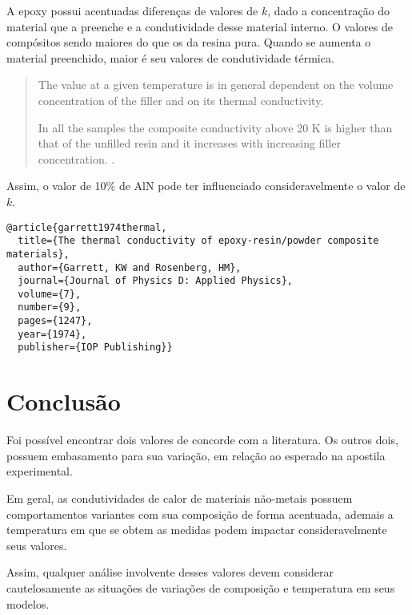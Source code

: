 \documentclass[11pt]{article}
\begin{document}
A epoxy possui acentuadas diferenças de valores de \(k\), dado a concentração do material que a preenche e a condutividade desse material interno. O valores de compósitos sendo maiores do que os da resina pura. Quando se aumenta o material preenchido, maior é seu valores de condutividade térmica.

\begin{quote}
The value at a given temperature is in general dependent on the volume concentration of the filler and on its thermal conductivity. 

In all the samples the composite conductivity above 20 K is higher than that of the unfilled resin and it increases with increasing filler concentration. \cite{garrett1974thermal}.
\end{quote}

Assim, o valor de 10\% de AlN pode ter influenciado consideravelmente o valor de \(k\).

\begin{verbatim}
@article{garrett1974thermal,
  title={The thermal conductivity of epoxy-resin/powder composite materials},
  author={Garrett, KW and Rosenberg, HM},
  journal={Journal of Physics D: Applied Physics},
  volume={7},
  number={9},
  pages={1247},
  year={1974},
  publisher={IOP Publishing}}
\end{verbatim}

\section{Conclusão}
\label{sec:org77b9d04}

Foi possível encontrar dois valores de concorde com a literatura. Os outros dois, possuem embasamento para sua variação, em relação ao esperado na apostila experimental.

Em geral, as condutividades de calor de materiais não-metais possuem comportamentos variantes com sua composição de forma acentuada, ademais a temperatura em que se obtem as medidas podem impactar consideravelmente seus valores.

Assim, qualquer análise involvente desses valores devem considerar cautelosamente as situações de variações de composição e temperatura em seus modelos.
\end{document}
